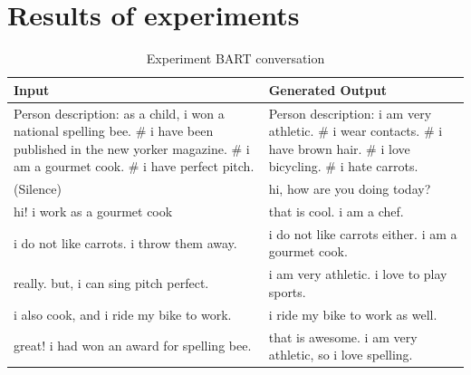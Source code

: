 \chapter{Results of experiments}

\begin{table}[ht]
\centering
 \begin{tabular}{|p{7cm}|p{7cm}|} 
 \hline\hline
 \textbf{Input} & \textbf{Generated Output} \\
 \hline\hline
 Person description: as a child, i won a national spelling bee. \# i have been published in the new yorker magazine. \# i am a gourmet cook. \# i have perfect pitch. & Person description: i am very athletic. \# i wear contacts. \# i have brown hair. \# i love bicycling. \# i hate carrots. \\
 \hline
 (Silence) & hi, how are you doing today?\\ 
 \hline
 hi! i work as a gourmet cook & that is cool. i am a chef. \\
 \hline
 i do not like carrots. i throw them away. & i do not like carrots either. i am a gourmet cook. \\
 \hline 
 really. but, i can sing pitch perfect. & i am very athletic. i love to play sports. \\
 \hline
 i also cook, and i ride my bike to work. & i ride my bike to work as well. \\
 \hline 
 great! i had won an award for spelling bee. & that is awesome. i am very athletic, so i love spelling. \\
 \hline\hline
 \end{tabular}
 \caption{Experiment BART conversation}
\label{tab:bart_conversation}
\end{table}



